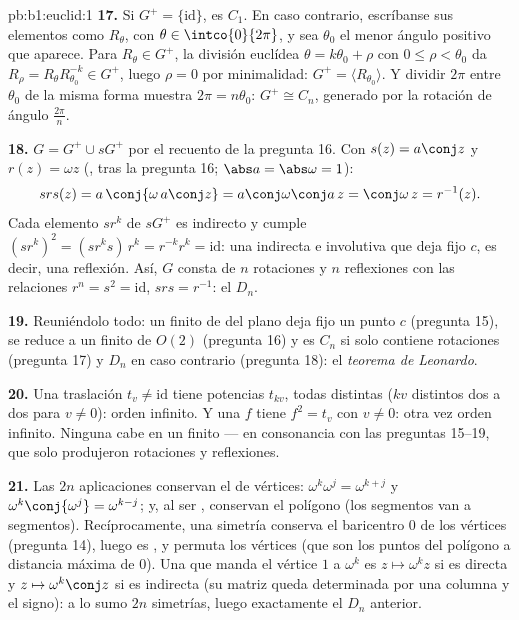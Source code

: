 \begin{solution}{pb:b1:euclid:1}
\textbf{17.} Si $G^{+} = \{\mathrm{id}\}$, es $C_1$. En caso
contrario, escríbanse sus elementos como $R_\theta$, con
$\theta \in \intco{0}{2\pi}$, y sea $\theta_0$ el menor ángulo
positivo que aparece. Para $R_\theta \in G^{+}$, la división euclídea
$\theta = k\theta_0 + \rho$ con $0 \leq \rho < \theta_0$ da
$R_\rho = R_\theta R_{\theta_0}^{-k} \in G^{+}$, luego $\rho = 0$ por
minimalidad: $G^{+} = \langle R_{\theta_0}\rangle$. Y dividir $2\pi$
entre $\theta_0$ de la misma forma muestra $2\pi = n\theta_0$:
$G^{+} \cong C_n$, generado por la rotación de ángulo
$\frac{2\pi}n$.

\textbf{18.} $G = G^{+} \cup sG^{+}$ por el recuento de la
pregunta 16. Con $s(z) = a\conj z$ y $r(z) = \omega z$
(, tras la pregunta 16; $\abs a = \abs\omega = 1$):
\[
s r s(z) = a\,\conj{\omega\,a\conj z}
= a\conj\omega\conj a\,z = \conj\omega\,z = r^{-1}(z) .
\]
Cada elemento $sr^k$ de $sG^{+}$ es indirecto y cumple
$(sr^k)^2 = (sr^ks)\,r^k = r^{-k}r^k = \mathrm{id}$: una 
indirecta e involutiva que deja fijo $c$, es decir, una reflexión.
Así, $G$ consta de $n$ rotaciones y $n$ reflexiones con las
relaciones $r^n = s^2 = \mathrm{id}$, $srs = r^{-1}$: el
 $D_n$.

\textbf{19.} Reuniéndolo todo: un  finito de  del
plano deja fijo un punto $c$ (pregunta 15), se reduce a un 
finito de $O(2)$ (pregunta 16) y es $C_n$ si solo contiene rotaciones
(pregunta 17) y $D_n$ en caso contrario (pregunta 18): el
\emph{teorema de Leonardo}.

\textbf{20.} Una traslación $t_v \neq \mathrm{id}$ tiene potencias
$t_{kv}$, todas distintas ($kv$ distintos dos a dos para $v \neq 0$):
orden infinito. Y una  $f$ tiene $f^2 = t_v$ con
$v \neq 0$: otra vez orden infinito. Ninguna cabe en un  finito
--- en consonancia con las preguntas 15--19, que solo produjeron
rotaciones y reflexiones.

\textbf{21.} Las $2n$ aplicaciones conservan el  de
vértices: $\omega^k \omega^j = \omega^{k+j}$ y
$\omega^k\conj{\omega^j} = \omega^{k-j}$; y, al ser ,
conservan el polígono (los segmentos van a segmentos).
Recíprocamente, una simetría conserva el baricentro $0$ de los
vértices (pregunta 14), luego es , y permuta los vértices
(que son los puntos del polígono a distancia máxima de $0$). Una
  que manda el vértice $1$ a $\omega^k$ es
$z \mapsto \omega^k z$ si es directa y $z \mapsto \omega^k\conj z$ si
es indirecta (su matriz queda determinada por una columna y el
signo): a lo sumo $2n$ simetrías, luego exactamente el $D_n$ anterior.


\end{solution}

